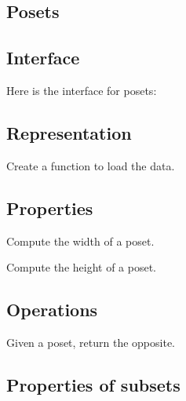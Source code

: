 \begin{exercise}
\section{Posets}

\subsection*{Interface}

Here is the interface for posets:

%

\subsection*{Representation}


\begin{exercise}[Representation]
Create a function to load the data.


%

\end{exercise}

\subsection{Properties}


\begin{exercise}
Compute the width of a poset.
\end{exercise}

\begin{exercise}
Compute the height of a poset.
\end{exercise}

\subsection{Operations}


\begin{exercise}
Given a poset, return the opposite.
\end{exercise}

\subsection{Properties of subsets}



\end{exercise}
